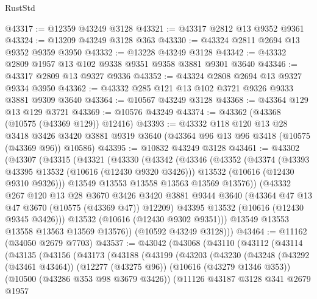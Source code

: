 \begin{lexlean}{RustStd}
\begin{coremodule}
@43317 := @12359 @43249 @3128
@43321 := @43317 @2812 @13 @9352 @9361
@43324 := @13209 @43249 @3128 @363
@43330 := @43324 @2811 @2694 @13 @9352 @9359 @3950
@43332 := @13228 @43249 @3128
@43342 := @43332 @2809 @1957 @13 @102 @9338 @9351 @9358 @3881 @9301 @3640
@43346 := @43317 @2809 @13 @9327 @9336
@43352 := @43324 @2808 @2694 @13 @9327 @9334 @3950
@43362 := @43332 @285 @121 @13 @102 @3721 @9326 @9333 @3881 @9309 @3640
@43364 := @10567 @43249 @3128
@43368 := @43364 @129 @13 @129 @3721
@43369 := @10576 @43249
@43374 := @43362 (@43368 (@10575 (@43369 @129)) @12416)
@43393 := @43332
    @118
    @120
    @13
    @28
    @3418
    @3426
    @3420
    @3881
    @9319
    @3640
    (@43364 @96 @13 @96 @3418 (@10575 (@43369 @96)) @10586)
@43395 := @10832 @43249 @3128
@43461 := @43302
    (@43307
      (@43315
        (@43321
          (@43330
            (@43342
              (@43346
                (@43352
                  (@43374
                    (@43393 @43395 @13532 (@10616 (@12430 @9320 @3426)))
                    @13532
                    (@10616 (@12430 @9310 @9326)))
                  @13549
                  @13553
                  @13558
                  @13563
                  @13569
                  @13576))
              (@43332
                @267
                @120
                @13
                @28
                @3670
                @3426
                @3420
                @3881
                @9344
                @3640
                (@43364 @47 @13 @47 @3670 (@10575 (@43369 @47)) @12209)
                @43395
                @13532
                (@10616 (@12430 @9345 @3426)))
              @13532
              (@10616 (@12430 @9302 @9351)))
            @13549
            @13553
            @13558
            @13563
            @13569
            @13576))
        (@10592 @43249 @3128)))
@43464 := @11162 (@34050 @2679 @7703)
@43537 := @43042
    (@43068
      (@43110
        (@43112
          (@43114
            (@43135
              (@43156
                (@43173
                  (@43188
                    (@43199
                      (@43203
                        (@43230
                          (@43248
                            (@43292 (@43461 @43464))
                            (@12277 (@43275 @96))
                            (@10616 (@43279 @1346 @353))
                            (@10500 (@43286 @353 @98 @3679 @3426))
                            (@11126
                              @43187
                              @3128
                              @341
                              @2679
                              @1957

\end{coremodule}
\end{lexlean}
